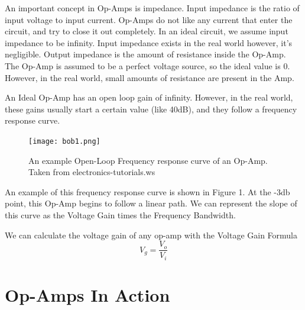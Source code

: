 \documentclass[letterpaper,12pt]{article}
\begin{document}
An important concept in Op-Amps is impedance. Input impedance is the ratio of input voltage to input current. Op-Amps do not like any current that enter the circuit, and try to close it out completely. In an ideal circuit, we assume input impedance to be infinity. Input impedance exists in the real world however, it's negligible. Output impedance is the amount of resistance inside the Op-Amp. The Op-Amp is assumed to be a perfect voltage source, so the ideal value is 0. However, in the real world, small amounts of resistance are present in the Amp.

An Ideal Op-Amp has an open loop gain of infinity. However, in the real world, these gains usually start a certain value (like 40dB), and they follow a frequency response curve.

\begin{figure}
    \centering
    \texttt{[image: bob1.png]}
    \caption{An example Open-Loop Frequency response curve of an Op-Amp. Taken from electronics-tutorials.ws}
\end{figure}

An example of this frequency response curve is shown in Figure 1. At the -3db point, this Op-Amp begins to follow a linear path. We can represent the slope of this curve as the Voltage Gain times the Frequency Bandwidth.

We can calculate the voltage gain of any op-amp with the Voltage Gain Formula
\begin{equation}
   V_g = \frac{V_o}{V_i}
   \label{Eq:VoltageGain} %
\end{equation}

\section{ Op-Amps In Action}
\end{document}
